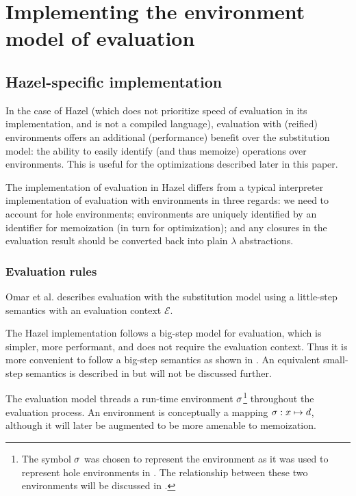 \section{Implementing the environment model of evaluation}
\label{sec:env_model_evaluation}

\subsection{Hazel-specific implementation}
\label{sec:eval_with_envs}

In the case of Hazel (which does not prioritize speed of evaluation in its implementation, and is not a compiled language), evaluation with (reified) environments offers an additional (performance) benefit over the substitution model: the ability to easily identify (and thus memoize) operations over environments. This is useful for the optimizations described later in this paper.

The implementation of evaluation in Hazel differs from a typical interpreter implementation of evaluation with environments in three regards: we need to account for hole environments; environments are uniquely identified by an identifier for memoization (in turn for optimization); and any closures in the evaluation result should be converted back into plain $\lambda$ abstractions.

\subsubsection{Evaluation rules}
\label{sec:evalenv-rules}


Omar et al. \cite{conf/popl/HazelnutLive19} describes evaluation with the substitution model using a little-step semantics with an evaluation context $\mathcal{E}$. 

The Hazel implementation follows a big-step model for evaluation, which is simpler, more performant, and does not require the evaluation context. Thus it is more convenient to follow a big-step semantics as shown in . An equivalent small-step semantics is described in  but will not be discussed further.

The evaluation model threads a run-time environment $\sigma$\footnote{The symbol $\sigma$ was chosen to represent the environment as it was used to represent hole environments in \cite{conf/popl/HazelnutLive19}. The relationship between these two environments will be discussed in .} throughout the evaluation process. An environment is conceptually a mapping $\sigma:x\mapsto d$, although it will later be augmented to be more amenable to memoization.

